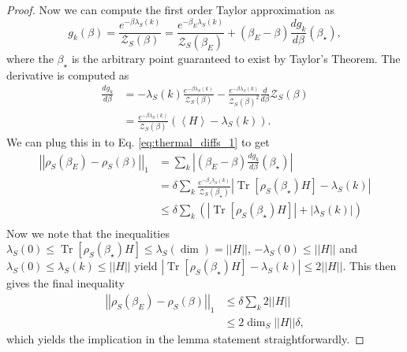\documentclass{article}
\newcommand{\parens}[1]{\left( #1 \right)}
\newcommand{\brackets}[1]{\left[ #1 \right]}
\newcommand{\abs}[1]{\left| #1 \right|}
\newcommand{\norm}[1]{\left| \left| #1 \right| \right|}
\newcommand{\anglebrackets}[1]{\left< #1 \right>}
\DeclareMathOperator{\Tr}{Tr}
\newcommand{\trace}[1]{\Tr \brackets{ #1 }}
\newcommand{\partfun}{\mathcal{Z}}
\begin{document}
\begin{proof}
    Now we can compute the first order Taylor approximation as
    \begin{equation}
        g_k(\beta) = \frac{e^{-\beta \lambda_S(k)}}{\partfun_S(\beta)} = \frac{e^{-\beta_E \lambda_S(k)}}{\partfun_S(\beta_E)} + (\beta_E - \beta) \frac{d g_k}{d\beta} (\beta_{\star}),
    \end{equation}
    where the $\beta_{\star}$ is the arbitrary point guaranteed to exist by Taylor's Theorem. The derivative is computed as
    \begin{align}
        \frac{d g_k}{d \beta} &= - \lambda_S(k) \frac{e^{-\beta \lambda_S(k)}}{\partfun_S(\beta)} - \frac{e^{-\beta \lambda_S(k)}}{\partfun_S(\beta)^2} \frac{d}{d\beta}\partfun_S(\beta) \\
        &= \frac{e^{-\beta \lambda_S(k)}}{\partfun_S(\beta)} \parens{\anglebrackets{H} - \lambda_S(k)}.
    \end{align}
    We can plug this in to Eq. \eqref{eq:thermal_diffs_1} to get
    \begin{align}
        \norm{\rho_S(\beta_E) - \rho_S(\beta)}_1 &= \sum_k \abs{(\beta_E - \beta) \frac{d g_k}{d\beta} (\beta_{\star})} \\
        &= \delta \sum_k \frac{e^{-\beta_{\star} \lambda_S(k)}}{\partfun_S(\beta_{\star})} \abs{\trace{\rho_S(\beta_{\star})H} - \lambda_S(k)} \\
        &\leq \delta \sum_k \parens{|\trace{\rho_S(\beta_{\star}) H}| + |\lambda_S(k)|} \\
        &
    \end{align}
    Now we note that the inequalities $\lambda_S(0) \leq \trace{\rho_S(\beta_{\star}) H} \leq \lambda_S(\dim) = \norm{H}$, $-\lambda_S(0) \leq \norm{H}$ and $\lambda_S(0) \leq \lambda_S(k) \leq \norm{H}$ yield $\abs{\trace{\rho_S(\beta_{\star}) H} - \lambda_S(k)} \leq 2 \norm{H}$. This then gives the final inequality
    \begin{align}
        \norm{\rho_S(\beta_E) - \rho_S(\beta)}_1 &\leq \delta \sum_k 2 \norm{H} \\
        &\leq 2 \dim_S \norm{H} \delta,
    \end{align}
    which yields the implication in the lemma statement straightforwardly.
\end{proof}
\end{document}
